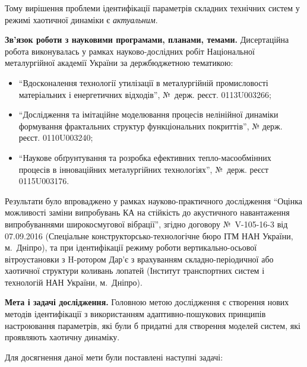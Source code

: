 \documentclass[a4paper,13pt]{atuaref}
\begin{document}
Тому вирішення проблеми
ідентифікації параметрів складних технічних систем у режимі хаотичної динаміки
є \textit{актуальним}.

\smallskip
\textbf{Зв'язок роботи з науковими програмами, планами, темами.}
Дисертаційна робота виконувалась у рамках науково-дослідних робіт
Національної металургійної академії України за держбюджетною
тематикою:

\begin{itemize}


\item
  ``Вдосконалення технології утилізації в металургійній промисловості
  матеріальних і енергетичних відходів'', №~держ. реєст. 0113U003266;

  \item
  ``Дослідження та імітаційне моделювання процесів нелінійної динаміки
  формування фрактальних структур функціональних   покриттів'',
  № держ. реєст. 0110U003240;

  \item
  ``Наукове обґрунтування та розробка ефективних тепло-масообмінних
  процесів в інноваційних металургійних технологіях'', №~держ. реєст 0115U003176.

\end{itemize}

Результати було впроваджено у рамках науково-практичного дослідження
``Оцінка можливості заміни випробувань КА на стійкість до акустичного навантаження
випробуваннями широкосмугової вібрації'', згідно договору \hbox{№~V-105-16-3} від 07.09.2016
(Спеціальне конструкторсько-технологічне бюро ІТМ НАН України, м.~Дніпро),
та при ідентифікації режиму роботи вертикально-осьової вітроустановки з H-ротором Дар'є
з врахуванням складно-періодичної або хаотичної структури коливань лопатей
(Інститут транспортних систем і технологій НАН України, м.~Дніпро).

\textbf{Мета і задачі дослідження.}
Головною метою дослідження є створення нових методів ідентифікації з
використанням адаптивно-пошукових принципів настроювання параметрів, які
були б придатні для створення моделей систем, які проявляють хаотичну динаміку.

Для досягнення даної мети були поставлені наступні задачі:
\end{document}
